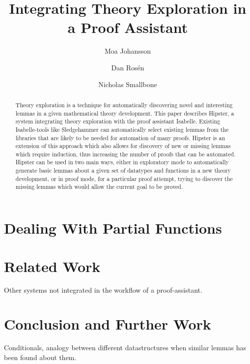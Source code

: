 \documentclass{llncs}
\begin{document}
\title{Integrating Theory Exploration in a Proof Assistant}

\author{Moa Johansson \and Dan Ros\'en \and Nicholas Smallbone}


\maketitle

\begin{abstract}
Theory exploration is a technique for automatically discovering novel and interesting lemmas in a given mathematical theory development. This paper describes Hipster, a system integrating theory exploration with the proof assistant Isabelle.
Existing Isabelle-tools like Sledgehammer can automatically select existing lemmas from the libraries that are likely to be needed for automation of many proofs. Hipster is an extension of this approach which also allows for discovery of new or missing lemmas which require induction, thus increasing the number of proofs that can be automated.
Hipster can be used in two main ways, either in exploratory mode to automatically generate basic lemmas about a given set of datatypes and functions in a new theory development, or in proof mode, for a particular proof attempt, trying to discover the missing lemmas which would allow the current goal to be proved. 

\end{abstract}







\section{Dealing With Partial Functions}
\label{sec:partial}


\section{Related Work}
%
Other systems not integrated in the workflow of a proof-assistant. 


\section{Conclusion and Further Work}
%
Conditionals, analogy between different datastructures when similar lemmas has been found about them. 



\end{document}
